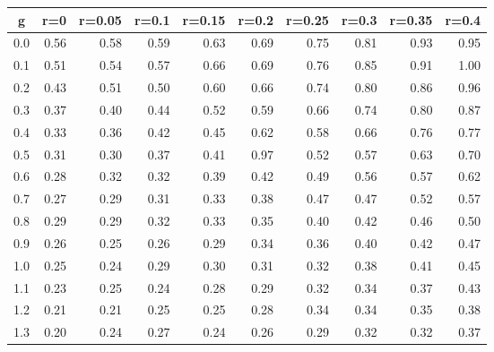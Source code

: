 %
\begin{table}[!tbp]
 \begin{center}
 \begin{tabular}{rrrrrrrrrr}\hline\hline
\multicolumn{1}{c}{g}&\multicolumn{1}{c}{r=0}&\multicolumn{1}{c}{r=0.05}&\multicolumn{1}{c}{r=0.1}&\multicolumn{1}{c}{r=0.15}&\multicolumn{1}{c}{r=0.2}&\multicolumn{1}{c}{r=0.25}&\multicolumn{1}{c}{r=0.3}&\multicolumn{1}{c}{r=0.35}&\multicolumn{1}{c}{r=0.4}\tabularnewline
\hline
0.0&0.56&0.58&0.59&0.63&0.69&0.75&0.81&0.93&0.95\tabularnewline
0.1&0.51&0.54&0.57&0.66&0.69&0.76&0.85&0.91&1.00\tabularnewline
0.2&0.43&0.51&0.50&0.60&0.66&0.74&0.80&0.86&0.96\tabularnewline
0.3&0.37&0.40&0.44&0.52&0.59&0.66&0.74&0.80&0.87\tabularnewline
0.4&0.33&0.36&0.42&0.45&0.62&0.58&0.66&0.76&0.77\tabularnewline
0.5&0.31&0.30&0.37&0.41&0.97&0.52&0.57&0.63&0.70\tabularnewline
0.6&0.28&0.32&0.32&0.39&0.42&0.49&0.56&0.57&0.62\tabularnewline
0.7&0.27&0.29&0.31&0.33&0.38&0.47&0.47&0.52&0.57\tabularnewline
0.8&0.29&0.29&0.32&0.33&0.35&0.40&0.42&0.46&0.50\tabularnewline
0.9&0.26&0.25&0.26&0.29&0.34&0.36&0.40&0.42&0.47\tabularnewline
1.0&0.25&0.24&0.29&0.30&0.31&0.32&0.38&0.41&0.45\tabularnewline
1.1&0.23&0.25&0.24&0.28&0.29&0.32&0.34&0.37&0.43\tabularnewline
1.2&0.21&0.21&0.25&0.25&0.28&0.34&0.34&0.35&0.38\tabularnewline
1.3&0.20&0.24&0.27&0.24&0.26&0.29&0.32&0.32&0.37\tabularnewline
\hline
\end{tabular}

\end{center}

\end{table}

